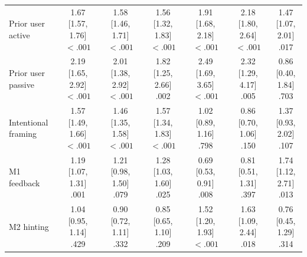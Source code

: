 \begin{table}[p]
{\begin{tabular}{lcccccc}
Prior user active & \makecell{1.67 [1.57, 1.76]\\$<.001$} & \makecell{1.58 [1.46, 1.71]\\$<.001$} & \makecell{1.56 [1.32, 1.83]\\$<.001$} & \makecell{1.91 [1.68, 2.18]\\$<.001$} & \makecell{2.18 [1.80, 2.64]\\$<.001$} & \makecell{1.47 [1.07, 2.01]\\.017} \\
Prior user passive & \makecell{2.19 [1.65, 2.92]\\$<.001$} & \makecell{2.01 [1.38, 2.92]\\$<.001$} & \makecell{1.82 [1.25, 2.66]\\.002} & \makecell{2.49 [1.69, 3.65]\\$<.001$} & \makecell{2.32 [1.29, 4.17]\\.005} & \makecell{0.86 [0.40, 1.84]\\.703} \\
Intentional framing & \makecell{1.57 [1.49, 1.66]\\$<.001$} & \makecell{1.46 [1.35, 1.58]\\$<.001$} & \makecell{1.57 [1.34, 1.83]\\$<.001$} & \makecell{1.02 [0.89, 1.16]\\.798} & \makecell{0.86 [0.70, 1.06]\\.150} & \makecell{1.37 [0.93, 2.02]\\.107} \\
M1 feedback & \makecell{1.19 [1.07, 1.31]\\.001} & \makecell{1.21 [0.98, 1.50]\\.079} & \makecell{1.28 [1.03, 1.60]\\.025} & \makecell{0.69 [0.53, 0.91]\\.008} & \makecell{0.81 [0.51, 1.31]\\.397} & \makecell{1.74 [1.12, 2.71]\\.013} \\
M2 hinting & \makecell{1.04 [0.95, 1.14]\\.429} & \makecell{0.90 [0.72, 1.11]\\.332} & \makecell{0.85 [0.65, 1.10]\\.209} & \makecell{1.52 [1.20, 1.93]\\$<.001$} & \makecell{1.63 [1.09, 2.44]\\.018} & \makecell{0.76 [0.45, 1.29]\\.314} \\

\end{tabular}}
\end{table}
